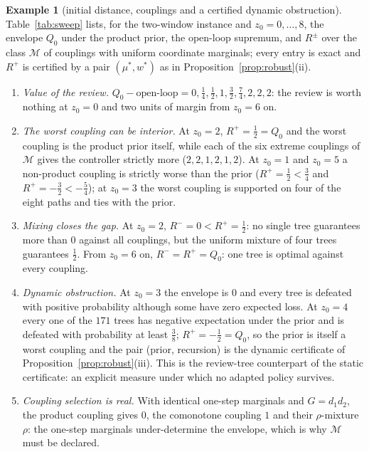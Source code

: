 \documentclass[11pt,a4paper]{article}
\theoremstyle{plain}
\theoremstyle{definition}
\newtheorem{example}[theorem]{Example}
\theoremstyle{remark}
\newcommand{\calM}{\mathcal{M}}
\newcommand{\tfr}[2]{\tfrac{#1}{#2}}
\begin{document}
\begin{example}[initial distance, couplings and a certified dynamic obstruction]\label{ex:sweep}
Table~\ref{tab:sweep} lists, for the two-window instance and $z_0=0,\dots,8$, the envelope $Q_0$ under the product prior, the open-loop supremum, and $R^\pm$ over the class $\calM$ of couplings with uniform coordinate marginals; every entry is exact and $R^+$ is certified by a pair $(\mu^\ast,w^\ast)$ as in Proposition~\ref{prop:robust}(ii).
\begin{enumerate}[leftmargin=1.6em,itemsep=1pt]
\item \emph{Value of the review.} $Q_0-\text{open-loop}=0,\tfr14,\tfr12,1,\tfr32,\tfr74,2,2,2$: the review is worth nothing at $z_0=0$ and two units of margin from $z_0=6$ on.
\item \emph{The worst coupling can be interior.} At $z_0=2$, $R^+=\tfr12=Q_0$ and the worst coupling is the product prior itself, while each of the six extreme couplings of $\calM$ gives the controller strictly more ($2,2,1,2,1,2$). At $z_0=1$ and $z_0=5$ a non-product coupling is strictly worse than the prior ($R^+=\tfr12<\tfr34$ and $R^+=-\tfr32<-\tfr54$); at $z_0=3$ the worst coupling is supported on four of the eight paths and ties with the prior.
\item \emph{Mixing closes the gap.} At $z_0=2$, $R^-=0<R^+=\tfr12$: no single tree guarantees more than $0$ against all couplings, but the uniform mixture of four trees guarantees $\tfr12$. From $z_0=6$ on, $R^-=R^+=Q_0$: one tree is optimal against every coupling.
\item \emph{Dynamic obstruction.} At $z_0=3$ the envelope is $0$ and every tree is defeated with positive probability although some have zero expected loss. At $z_0=4$ every one of the $171$ trees has negative expectation under the prior and is defeated with probability at least $\tfr38$; $R^+=-\tfr12=Q_0$, so the prior is itself a worst coupling and the pair (prior, recursion) is the dynamic certificate of Proposition~\ref{prop:robust}(iii). This is the review-tree counterpart of the static certificate: an explicit measure under which no adapted policy survives.
\item \emph{Coupling selection is real.} With identical one-step marginals and $G=d_1d_2$, the product coupling gives $0$, the comonotone coupling $1$ and their $\rho$-mixture $\rho$: the one-step marginals under-determine the envelope, which is why $\calM$ must be declared.
\end{enumerate}
\end{example}
\end{document}
